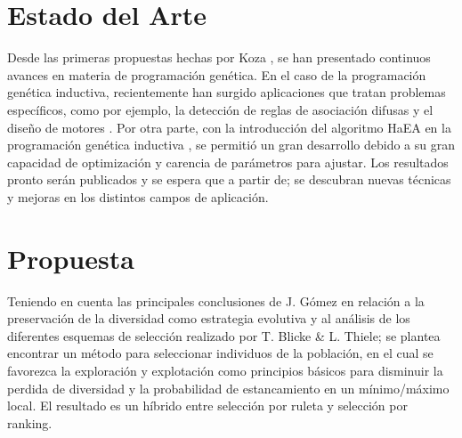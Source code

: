 \documentclass{llncs}
\begin{document}
\section{Estado del Arte}
Desde las primeras propuestas hechas por Koza \cite{koza}, se han presentado continuos avances \cite{koza:1} en materia de programación genética. En el caso de la programación genética inductiva, recientemente han surgido aplicaciones que tratan problemas específicos, como por ejemplo, la detección de reglas de asociación difusas \cite{gonz} y el diseño de motores \cite{karim}.
Por otra parte, con la introducción del algoritmo HaEA \cite{gomez} en la programación genética inductiva \cite{cub:gom:2}, se permitió un gran desarrollo debido a su gran capacidad de optimización y carencia de parámetros para ajustar. Los resultados pronto serán publicados y se espera que a partir de; se descubran nuevas técnicas y mejoras en los distintos campos de aplicación.

\section{Propuesta}
Teniendo en cuenta las principales conclusiones de J. Gómez \cite{gomez} en relación a la preservación de la diversidad como estrategia evolutiva y al análisis de los diferentes esquemas de selección realizado por T. Blicke \& L. Thiele\cite{blick:thiele}; se plantea encontrar un método para seleccionar individuos de la población, en el cual se favorezca la   exploración y explotación como principios básicos para disminuir la perdida de diversidad y la probabilidad de estancamiento en un mínimo/máximo local. El resultado es un híbrido entre selección por ruleta y selección por ranking.
\end{document}
